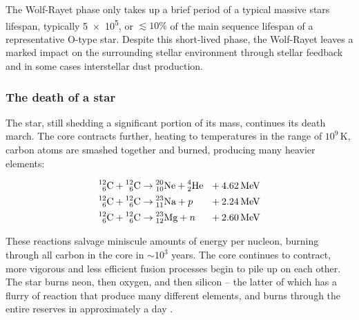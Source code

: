 The Wolf-Rayet phase only takes up a brief period of a typical massive stars lifespan, typically \SI{5e5}{\year}, or $\lesssim 10\%$ of the main sequence lifespan of a representative O-type star.
Despite this short-lived phase, the Wolf-Rayet leaves a marked impact on the surrounding stellar environment through stellar feedback and in some cases interstellar dust production.

\subsubsection{The death of a star}

The star, still shedding a significant portion of its mass, continues its death march.
The core contracts further, heating to temperatures in the range of $10^9 \, \si{\kelvin}$, carbon atoms are smashed together and burned, producing many heavier elements:

\begin{equation}
  \begin{alignedat}{3}
    \atom{C}{12}{6} + \atom{C}{12}{6} & \rightarrow \atom{Ne}{20}{10} + \atom{He}{4}{2} && ~~ + \SI{4.62}{\mega\electronvolt} \\
    \atom{C}{12}{6} + \atom{C}{12}{6} & \rightarrow \atom{Na}{23}{11} + p && ~~ + \SI{2.24}{\mega\electronvolt} \\
    \atom{C}{12}{6} + \atom{C}{12}{6} & \rightarrow \atom{Mg}{23}{12} + n && ~~ + \SI{2.60}{\mega\electronvolt}
  \end{alignedat}
\end{equation}

\noindent
These reactions salvage miniscule amounts of energy per nucleon, burning through all carbon in the core in $\sim 10^3$ years.
The core continues to contract, more vigorous and less efficient fusion processes begin to pile up on each other.
The star burns neon, then oxygen, and then silicon -- the latter of which has a flurry of reaction  that produce many different elements, and burns through the entire reserves in approximately a day
\parencite[Ch.~6]{ryanStellarEvolutionNucleosynthesis2010a}.

